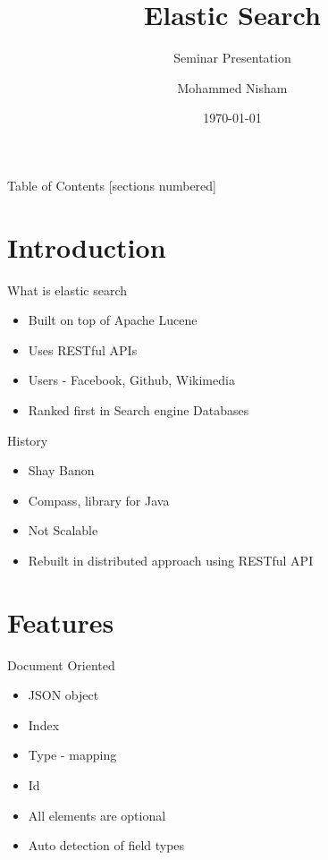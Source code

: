 \documentclass[10pt]{beamer}
\title{Elastic Search}
\subtitle{Seminar Presentation}
\date{\today}
\author{Mohammed Nisham}
\institute{College of Engineering, Trivandrum}
\begin{document}
\nocite{*}
\maketitle

\begin{frame}{Table of Contents}
  [sections numbered]
  \tableofcontents[hideallsubsections]
\end{frame}

\section{Introduction}
\begin{frame}{What is elastic search}
	\begin{itemize}
		\item Built on top of Apache Lucene
		\item Uses RESTful APIs
		\item Users - Facebook, Github, Wikimedia
		\item Ranked first in Search engine Databases
	\end{itemize}
\end{frame}

\begin{frame}{History}
	\begin{itemize}
		\item Shay Banon
		\item Compass, library for Java
		\item Not Scalable
		\item Rebuilt in distributed approach using RESTful API
	\end{itemize}
\end{frame}


\section{Features}

\begin{frame}{Document Oriented}
	\begin{itemize}
		\item JSON object
		\item Index
		\item Type - mapping
		\item Id
		\item All elements are optional
		\item Auto detection of field types
	\end{itemize}
\end{frame}
\end{document}
